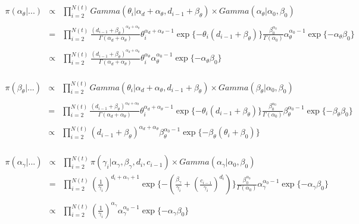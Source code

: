 \\
\begin{eqnarray*}
\pi(\alpha_\theta|...)&\propto&\prod_{i=2}^{N(t)} Gamma(\theta_i|\alpha_d+\alpha_\theta,d_{i-1}+\beta_\theta)\times Gamma(\alpha_\theta|\alpha_0,\beta_0)\\
\\
&=&\prod_{i=2}^{N(t)}\frac{(d_{i-1}+\beta_\theta)^{\alpha_d+\alpha_\theta}}{\Gamma(\alpha_d+\alpha_\theta)} \theta_i^{\alpha_d+\alpha_\theta-1} \exp{\{-\theta_i(d_{i-1}+\beta_\theta)\}}\frac{\beta_0^{\alpha_0}}{\Gamma(\alpha_0)} \alpha_\theta^{\alpha_0-1}\exp{\{-\alpha_\theta\beta_0\}}\\
\\
&\propto& \prod_{i=2}^{N(t)}\frac{(d_{i-1}+\beta_\theta)^{\alpha_d+\alpha_\theta}}{\Gamma(\alpha_d+\alpha_\theta)} \theta_i^{\alpha_\theta}\alpha_\theta^{\alpha_0-1}\exp{\{-\alpha_\theta\beta_0\}}
\end{eqnarray*}
\\
\begin{eqnarray*}
\pi(\beta_\theta|...)&\propto&\prod_{i=2}^{N(t)} Gamma(\theta_i|\alpha_d+\alpha_\theta,d_{i-1}+\beta_\theta)\times Gamma(\beta_\theta|\alpha_0,\beta_0)\\
\\
&=&\prod_{i=2}^{N(t)}\frac{(d_{i-1}+\beta_\theta)^{\alpha_d+\alpha_\theta}}{\Gamma(\alpha_d+\alpha_\theta)} \theta_i^{\alpha_d+\alpha_\theta-1} \exp{\{-\theta_i(d_{i-1}+\beta_\theta)\}}\frac{\beta_0^{\alpha_0}}{\Gamma(\alpha_0)} \beta_\theta^{\alpha_0-1}\exp{\{-\beta_\theta\beta_0\}}\\
\\
&\propto&\prod_{i=2}^{N(t)}(d_{i-1}+\beta_\theta)^{\alpha_d+\alpha_\theta}\beta_\theta^{\alpha_0-1} \exp{\{-\beta_\theta(\theta_i+\beta_0)\}}
\end{eqnarray*}
\\
\begin{eqnarray*}
\pi(\alpha_\gamma|...)&\propto&\prod_{i=2}^{N(t)} \pi(\gamma_i|\alpha_\gamma,\beta_\gamma,d_i,c_{i-1})\times Gamma(\alpha_\gamma|\alpha_0,\beta_0)\\
&=&\prod_{i=2}^{N(t)}(\frac{1}{\gamma_i})^{d_i+\alpha_\gamma+1}\exp{\{-(\frac{\beta_\gamma}{\gamma_i}+(\frac{c_{i-1}}{\gamma_i})^{d_i})\}}\frac{\beta_0^{\alpha_0}}{\Gamma(\alpha_0)} \alpha_\gamma^{\alpha_0-1}\exp{\{-\alpha_\gamma\beta_0\}}\\
\\
&\propto&\prod_{i=2}^{N(t)} (\frac{1}{\gamma_i})^{\alpha_\gamma}\alpha_\gamma^{\alpha_0-1}\exp{\{-\alpha_\gamma\beta_0\}}
\end{eqnarray*}
